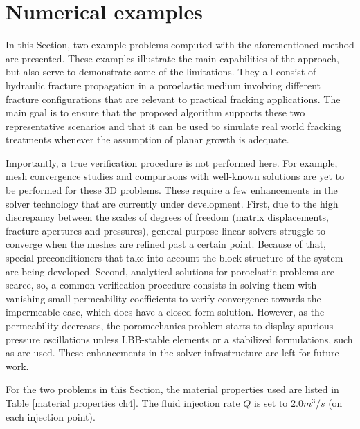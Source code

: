 \section{Numerical examples}
\label{section: Chapter4/examples}

In this Section, two example problems computed with the aforementioned method are presented. These examples illustrate the main capabilities of the approach, but also serve to demonstrate some of the limitations. They all consist of hydraulic fracture propagation in a poroelastic medium involving different fracture configurations that are relevant to practical fracking applications. The main goal is to ensure that the proposed algorithm supports these two representative scenarios and that it can be used to simulate real world fracking treatments whenever the assumption of planar growth is adequate. 

Importantly, a true verification procedure is not performed here. For example, mesh convergence studies and comparisons with well-known solutions are yet to be performed for these 3D problems. These require a few enhancements in the solver technology that are currently under development. First, due to the high discrepancy between the scales of degrees of freedom (matrix displacements, fracture apertures and pressures), general purpose linear solvers struggle to converge when the meshes are refined past a certain point. Because of that, special preconditioners that take into account the block structure of the system are being developed. Second, analytical solutions for poroelastic problems are scarce, so, a common verification procedure consists in solving them with vanishing small permeability coefficients to verify convergence towards the impermeable case, which does have a closed-form solution. However, as the permeability decreases, the poromechanics problem starts to display spurious pressure oscillations unless LBB-stable elements \cite{arnold1984stable} or a stabilized formulations, such as \cite{white2008stabilized} are used. These enhancements in the solver infrastructure are left for future work.

For the two problems in this Section, the material properties used are listed in Table \ref{material properties ch4}. The fluid injection rate $Q$ is set to $2.0 m^3/s$ (on each injection point).

